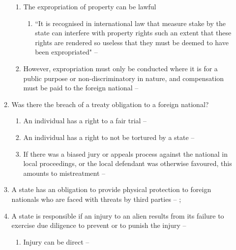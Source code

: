 \begin{enumerate}
\begin{enumerate}
\begin{enumerate}
            \item The expropriation of property can be lawful
            \begin{enumerate}
                \item ``It is recognised in international law that measure stake by the state can interfere with property rights such an extent that these rights are rendered so useless that they must be deemed to have been expropriated" -- 
            \end{enumerate}
            \item However, expropriation must only be conducted where it is for a public purpose or non-discriminatory in nature, and compensation must be paid to the foreign national -- 
        \end{enumerate}
        \item Was there the breach of a treaty obligation to a foreign national?
        \begin{enumerate}
            \item An individual has a right to a fair trial -- 
            \item An individual has a right to not be tortured by a state -- 
            \item If there was a biased jury or appeals process against the national in local proceedings, or the local defendant was otherwise favoured, this amounts to mistreatment -- 
        \end{enumerate}
        \item A state has an obligation to provide physical protection to foreign nationals who are faced with threats by third parties -- ; 
        \item A state is responsible if an injury to an alien results from its failure to exercise due diligence to prevent or to punish the injury -- 
        \begin{enumerate}
            \item Injury can be direct -- 

\end{enumerate}
\end{enumerate}
\end{enumerate}
